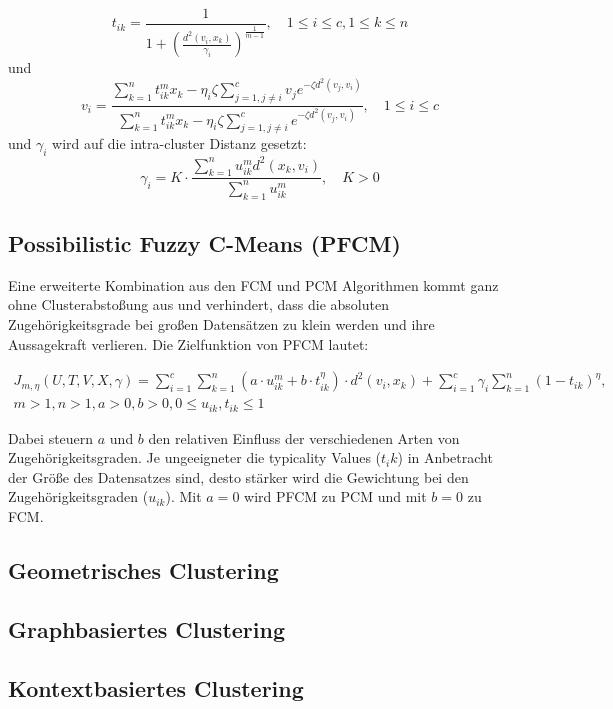 \documentclass[11pt,ceqn]{book}
\begin{document}
$$t_{ik} = \frac{1}{1+\left(\frac{d^2(v_i,x_k)}{\gamma_i}\right)^{\frac{1}{m-1}}},\quad 1\leqslant i \leqslant c, 1\leqslant k\leqslant n$$
und
$$v_i = \frac{\sum\limits_{k=1}^n t_{ik}^m x_k - \eta_i \zeta \sum\limits_{j=1,j\neq i}^c v_j e^{-\zeta d^2(v_j,v_i)}}{\sum\limits_{k=1}^n t_{ik}^m x_k - \eta_i \zeta \sum\limits_{j=1,j\neq i}^c e^{-\zeta d^2(v_j,v_i)}},\quad 1\leqslant i \leqslant c$$
und $\gamma_i$ wird auf die intra-cluster Distanz gesetzt:
$$\gamma_i = K\cdot \frac{\sum\limits_{k=1}^n u_{ik}^m d^2 (x_k, v_i)}{\sum\limits_{k=1}^n u_{ik}^m},\quad K>0$$

\subsection{Possibilistic Fuzzy C-Means (PFCM)}
Eine erweiterte Kombination aus den FCM und PCM Algorithmen kommt ganz ohne Clusterabstoßung aus und verhindert, dass die absoluten Zugehörigkeitsgrade bei großen Datensätzen zu klein werden und ihre Aussagekraft verlieren. Die Zielfunktion von PFCM\cite{pfcmpaper} lautet:

\begin{equation}
\begin{split}
J_{m,\eta}(U,T,V,X,\gamma) = \sum_{i=1}^{c} \sum_{k=1}^{n} \left(a\cdot u_{ik}^m + b\cdot t_{ik}^{\eta}\right)\cdot d^2(v_i,x_k) + \sum_{i=1}^c  \gamma_i \sum_{k=1}^n (1-t_{ik})^{\eta}, \\ m>1, n>1,a>0, b>0, 0\leqslant u_{ik}, t_{ik} \leqslant 1
\end{split}
\end{equation}

Dabei steuern $a$ und $b$ den relativen Einfluss der verschiedenen Arten von Zugehörigkeitsgraden. Je ungeeigneter die typicality Values ($t_ik$) in Anbetracht der Größe des Datensatzes sind, desto stärker wird die Gewichtung bei den Zugehörigkeitsgraden ($u_{ik}$). Mit $a=0$ wird PFCM zu PCM und mit $b=0$ zu FCM.

\subsection{Geometrisches Clustering}

\subsection{Graphbasiertes Clustering}

\subsection{Kontextbasiertes Clustering}
\end{document}
